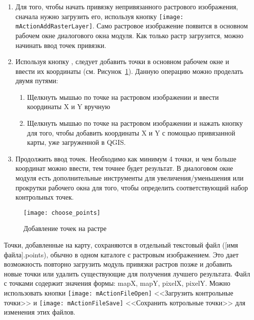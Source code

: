 \begin{enumerate}
\item Для того, чтобы начать привязку непривязанного растрового
изображения, сначала нужно загрузить его, используя кнопку
\texttt{[image: mActionAddRasterLayer]}. Само растровое
изображение появится в основном рабочем окне диалогового окна модуля.
Как только растр загрузится, можно начинать ввод точек привязки.
\item Используя кнопку ,
следует добавить точки в основном рабочем окне и ввести их координаты
(см. Рисунок~\ref{fig:choose_points}). Данную операцию можно проделать
двумя путями:

\begin{enumerate}
\item Щелкнуть мышью по точке на растровом изображении и ввести
координаты X и Y вручную
\item Щелкнуть мышью по точке на растровом изображении и нажать кнопку
 для того, чтобы добавить координаты X и Y
с помощью привязанной карты, уже загруженной в QGIS.
\end{enumerate}
\item Продолжить ввод точек. Необходимо как минимум 4 точки, и чем
больше координат можно ввести, тем точнее будет результат. В диалоговом
окне модуля есть дополнительные инструменты для увеличения/уменьшения
или прокрутки рабочего окна для того, чтобы определить соответствующий
набор контрольных точек.
\end{enumerate}

\begin{figure}[ht]
\centering
  \texttt{[image: choose\_points]}
  \caption{Добавление точек на растре \nixcaption}\label{fig:choose_points}
\end{figure}

Точки, добавленные на карту, сохраняются в отдельный текстовый файл
([имя файла].points), обычно в одном каталоге с растровым изображением.
Это дает возможность повторно загрузить модуль привязки растров позже и
добавить новые точки или удалить существующие для получения лучшего
результата. Файл с точками содержит значения формы: mapX, mapY, pixelX,
pixelY. Можно использовать кнопки
\texttt{[image: mActionFileOpen]} <<Загрузить контрольные точки>> и
\texttt{[image: mActionFileSave]} <<Сохранить котрольные точки>>
для изменения этих файлов.

\label{georeferencer_transformation}

